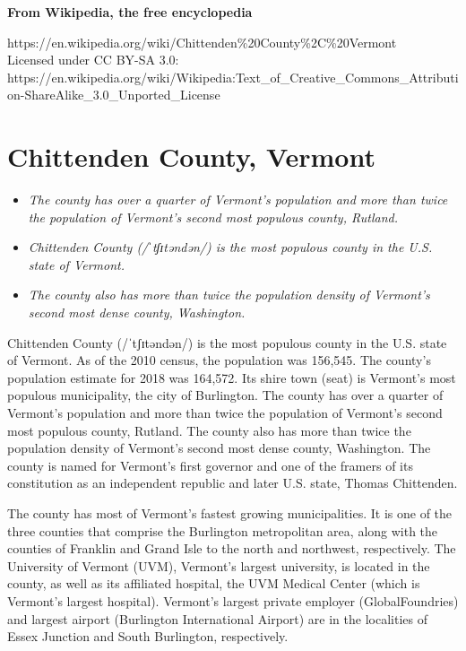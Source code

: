 \textbf{From Wikipedia, the free encyclopedia}

https://en.wikipedia.org/wiki/Chittenden\%20County\%2C\%20Vermont\\
Licensed under CC BY-SA 3.0:\\
https://en.wikipedia.org/wiki/Wikipedia:Text\_of\_Creative\_Commons\_Attribution-ShareAlike\_3.0\_Unported\_License

\section{Chittenden County, Vermont}\label{chittenden-county-vermont}

\begin{itemize}
\item
  \emph{The county has over a quarter of Vermont's population and more
  than twice the population of Vermont's second most populous county,
  Rutland.}
\item
  \emph{Chittenden County (/ˈtʃɪtəndən/) is the most populous county in
  the U.S. state of Vermont.}
\item
  \emph{The county also has more than twice the population density of
  Vermont's second most dense county, Washington.}
\end{itemize}

Chittenden County (/ˈtʃɪtəndən/) is the most populous county in the U.S.
state of Vermont. As of the 2010 census, the population was 156,545. The
county's population estimate for 2018 was 164,572. Its shire town (seat)
is Vermont's most populous municipality, the city of Burlington. The
county has over a quarter of Vermont's population and more than twice
the population of Vermont's second most populous county, Rutland. The
county also has more than twice the population density of Vermont's
second most dense county, Washington. The county is named for Vermont's
first governor and one of the framers of its constitution as an
independent republic and later U.S. state, Thomas Chittenden.

The county has most of Vermont's fastest growing municipalities. It is
one of the three counties that comprise the Burlington metropolitan
area, along with the counties of Franklin and Grand Isle to the north
and northwest, respectively. The University of Vermont (UVM), Vermont's
largest university, is located in the county, as well as its affiliated
hospital, the UVM Medical Center (which is Vermont's largest hospital).
Vermont's largest private employer (GlobalFoundries) and largest airport
(Burlington International Airport) are in the localities of Essex
Junction and South Burlington, respectively.

